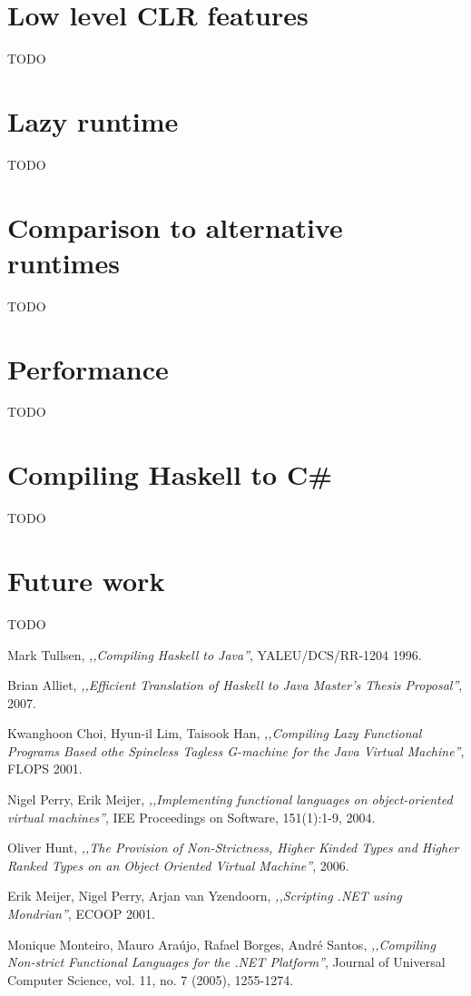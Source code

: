 \documentclass[en]{pracamgr}
\begin{document}
\chapter{Low level CLR features}\label{r:lowlevel}
TODO

\chapter{Lazy runtime}\label{r:runtime}
TODO

\chapter{Comparison to alternative runtimes}\label{r:alternatives}
TODO

\chapter{Performance}\label{r:perf}
TODO

\chapter{Compiling Haskell to C\#}\label{r:compiler}
TODO

\chapter{Future work}\label{r:future}
TODO


\begin{thebibliography}{99}

 Mark Tullsen, \textit{,,Compiling Haskell to Java''}, YALEU/DCS/RR-1204
1996.

 Brian Alliet, \textit{,,Efficient Translation of Haskell to Java
Master’s Thesis Proposal''}, 2007.

 Kwanghoon Choi, Hyun-il Lim, Taisook Han, \textit{,,Compiling Lazy Functional Programs Based othe Spineless Tagless G-machine for the Java Virtual Machine''}, FLOPS 2001.

 Nigel Perry, Erik Meijer, \textit{,,Implementing functional languages on object-oriented virtual machines''}, IEE Proceedings on Software, 151(1):1-9, 2004.

 Oliver Hunt, \textit{,,The Provision of Non-Strictness, Higher Kinded Types
and Higher Ranked Types on an Object Oriented Virtual Machine''}, 2006.

 Erik Meijer, Nigel Perry, Arjan van Yzendoorn, \textit{,,Scripting .NET using Mondrian''}, ECOOP 2001.

 Monique Monteiro, Mauro Ara\'ujo, Rafael Borges, Andr\'e Santos,  \textit{,,Compiling Non-strict Functional Languages for the .NET Platform''}, Journal of Universal Computer Science, vol. 11, no. 7 (2005), 1255-1274.

\end{thebibliography}
\end{document}
